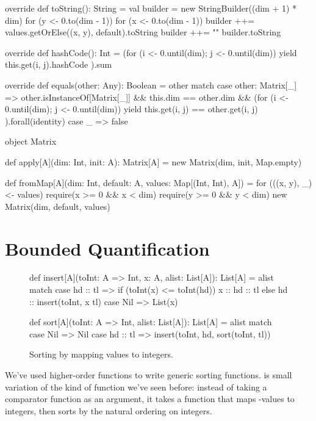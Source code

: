 \documentclass{book}
\begin{document}
\begin{scalacode}
{  override def toString(): String = {
    val builder = new StringBuilder((dim + 1) * dim)
    for (y <- 0.to(dim - 1)) {
      for (x <- 0.to(dim - 1)) {
        builder ++= values.getOrElse((x, y), default).toString
      }
      builder ++= "\n"
    }
    builder.toString
  }

  override def hashCode(): Int = {
    (for (i <- 0.until(dim); j <- 0.until(dim)) yield {
       this.get(i, j).hashCode
     }).sum
  }

  override def equals(other: Any): Boolean = other match {
    case other: Matrix[_] => {
      other.isInstanceOf[Matrix[_]] &&
      this.dim == other.dim &&
      (for (i <- 0.until(dim); j <- 0.until(dim)) yield {
        this.get(i, j) == other.get(i, j)
       }).forall(identity)
    }
    case _ => false
  }

}

object Matrix {

  def apply[A](dim: Int, init: A): Matrix[A] = {
    new Matrix(dim, init, Map.empty)
  }

  def fromMap[A](dim: Int, default: A, values: Map[(Int, Int), A]) = {
    for (((x, y), _) <- values) {
      require(x >= 0 && x < dim)
      require(y >= 0 && y < dim)
    }
    new Matrix(dim, default, values)
  }

}

\end{scalacode}

\newlecture


\section{Bounded Quantification}

\begin{figure}
\begin{scalacode}
def insert[A](toInt: A => Int, x: A, alist: List[A]): List[A] = alist match {
  case hd :: tl => if (toInt(x) <= toInt(hd)) { x :: hd :: tl } else { hd :: insert(toInt, x tl) }
  case Nil => List(x)
}

def sort[A](toInt: A => Int, alist: List[A]): List[A] = alist match {
  case Nil => Nil
  case hd :: tl => insert(toInt, hd, sort(toInt, tl))
}
\end{scalacode}
\caption{Sorting by mapping values to integers.}
\label{sortToIntHOF}
\end{figure}

We've used higher-order functions to write generic sorting functions.
 is small variation of the kind of function we've
seen before: instead of taking a comparator function as an argument, it takes a
 function that maps
-values to integers, then sorts by the natural ordering
on integers.
\end{document}
